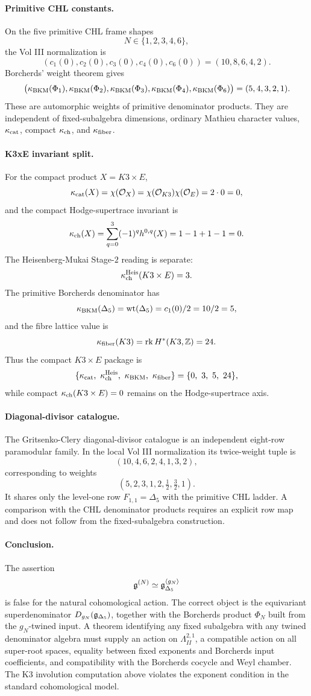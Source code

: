 \paragraph{Primitive CHL constants.}
On the five primitive CHL frame shapes
\[
  N\in\{1,2,3,4,6\},
\]
the Vol III normalization is
\[
  (c_1(0),c_2(0),c_3(0),c_4(0),c_6(0))
  =
  (10,8,6,4,2).
\]
Borcherds' weight theorem gives
\[
  \bigl(\kappa_{\mathrm{BKM}}(\Phi_1),\kappa_{\mathrm{BKM}}(\Phi_2),\kappa_{\mathrm{BKM}}(\Phi_3),
  \kappa_{\mathrm{BKM}}(\Phi_4),\kappa_{\mathrm{BKM}}(\Phi_6)\bigr)
  =
  (5,4,3,2,1).
\]
These are automorphic weights of primitive denominator products. They
are independent of fixed-subalgebra dimensions, ordinary Mathieu
character values, $\kappa_{\mathrm{cat}}$, compact $\kappa_{\mathrm{ch}}$, and $\kappa_{\mathrm{fiber}}$.

\paragraph{K3xE invariant split.}
For the compact product $X=K3\times E$,
\[
  \kappa_{\mathrm{cat}}(X)=\chi(\mathcal O_X)=
  \chi(\mathcal O_{K3})\chi(\mathcal O_E)=2\cdot 0=0,
\]
and the compact Hodge-supertrace invariant is
\[
  \kappa_{\mathrm{ch}}(X)=\sum_{q=0}^{3}(-1)^q h^{0,q}(X)
  =
  1-1+1-1=0.
\]
The Heisenberg-Mukai Stage-$2$ reading is separate:
\[
  \kappa_{\mathrm{ch}}^{\mathrm{Heis}}(K3\times E)=3.
\]
The primitive Borcherds denominator has
\[
  \kappa_{\mathrm{BKM}}(\Delta_5)=\mathrm{wt}(\Delta_5)=c_1(0)/2=10/2=5,
\]
and the fibre lattice value is
\[
  \kappa_{\mathrm{fiber}}(K3)=\operatorname{rk}H^*(K3,\mathbb Z)=24.
\]
Thus the compact $K3\times E$ package is
\[
  \{\kcat,\ \kch^{\mathrm{Heis}},\ \kBKM,\ \kfib\}
  =
  \{0,\ 3,\ 5,\ 24\},
\]
while compact $\kappa_{\mathrm{ch}}(K3\times E)=0$ remains on the Hodge-supertrace
axis.

\paragraph{Diagonal-divisor catalogue.}
The Gritsenko-Clery diagonal-divisor catalogue is an independent
eight-row paramodular family. In the local Vol III normalization its
twice-weight tuple is
\[
  (10,4,6,2,4,1,3,2),
\]
corresponding to weights
\[
  (5,2,3,1,2,\tfrac12,\tfrac32,1).
\]
It shares only the level-one row $F_{1,1}=\Delta_5$ with the primitive
CHL ladder. A comparison with the CHL denominator products requires an
explicit row map and does not follow from the fixed-subalgebra
construction.

\paragraph{Conclusion.}
The assertion
\[
  \mathfrak{g}^{(N)} \simeq \mathfrak{g}_{\Delta_5}^{\langle g_N\rangle}
\]
is false for the natural cohomological action. The correct object is
the equivariant superdenominator $D_{g_N}(\mathfrak{g}_{\Delta_5})$, together with the
Borcherds product $\Phi_N$ built from the $g_N$-twined input. A theorem
identifying any fixed subalgebra with any twined denominator algebra
must supply an action on $\Lambda^{2,1}_{II}$, a compatible action on
all super-root spaces, equality between fixed exponents and Borcherds
input coefficients, and compatibility with the Borcherds cocycle and
Weyl chamber. The K3 involution computation above violates the exponent
condition in the standard cohomological model.

